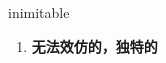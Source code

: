 
\begin{frame}
{\huge inimitable}
\begin{center}
\begin{enumerate}\Large
  \item \textbf{无法效仿的，独特的}
\end{enumerate}
\end{center}
\end{frame}
